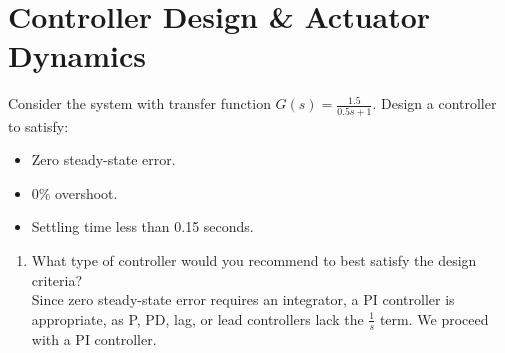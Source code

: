 \documentclass{article}
\begin{document}
\section{Controller Design \& Actuator Dynamics}
Consider the system with transfer function $G(s)=\frac{1.5}{0.5s+1}$. Design a controller to satisfy:
\begin{itemize}
  \item Zero steady-state error.
  \item 0\% overshoot.
  \item Settling time less than 0.15 seconds.
\end{itemize}
\begin{enumerate}
  \item What type of controller would you recommend to best satisfy the design criteria? \\
  Since zero steady-state error requires an integrator, a PI controller is appropriate, as P, PD, lag, or lead controllers lack the $\frac{1}{s}$ term. We proceed with a PI controller.


\end{enumerate}
\end{document}
